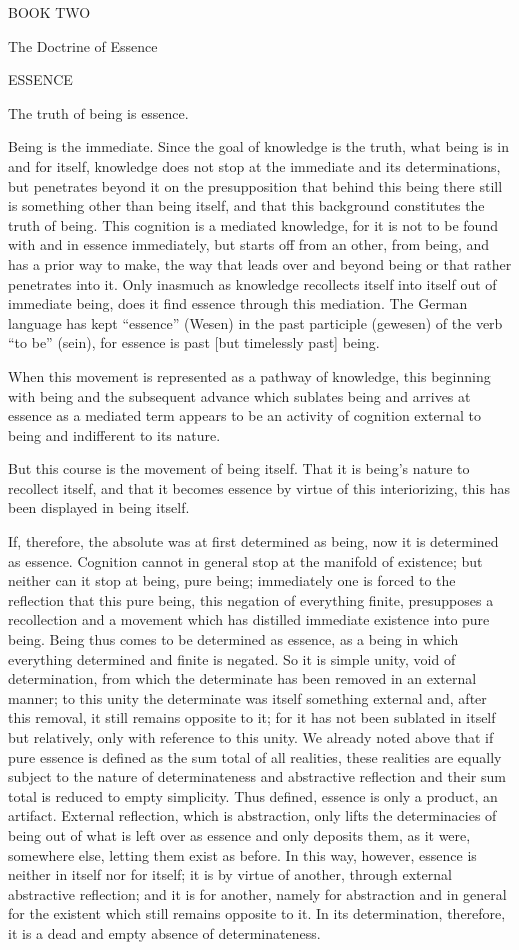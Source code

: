 BOOK TWO

The Doctrine of Essence

ESSENCE

The truth of being is essence.

Being is the immediate.
Since the goal of knowledge is the truth,
what being is in and for itself,
knowledge does not stop at
the immediate and its determinations,
but penetrates beyond it on
the presupposition that
behind this being there still is
something other than being itself,
and that this background
constitutes the truth of being.
This cognition is a mediated knowledge,
for it is not to be found
with and in essence immediately,
but starts off from an other, from being,
and has a prior way to make,
the way that leads over and beyond being
or that rather penetrates into it.
Only inasmuch as knowledge recollects
itself into itself out of immediate being,
does it find essence through this mediation.
The German language has kept “essence” (Wesen)
in the past participle (gewesen) of the verb “to be” (sein),
for essence is past [but timelessly past] being.

When this movement is represented as a pathway of knowledge,
this beginning with being and the subsequent advance
which sublates being and arrives at essence as a mediated term
appears to be an activity of cognition external to being
and indifferent to its nature.

But this course is the movement of being itself.
That it is being's nature to recollect itself,
and that it becomes essence by virtue of this interiorizing,
this has been displayed in being itself.

If, therefore, the absolute was
at first determined as being,
now it is determined as essence.
Cognition cannot in general stop
at the manifold of existence;
but neither can it stop at being, pure being;
immediately one is forced to the reflection that
this pure being, this negation of everything finite,
presupposes a recollection and a movement
which has distilled immediate existence into pure being.
Being thus comes to be determined as essence,
as a being in which everything determined and finite is negated.
So it is simple unity, void of determination,
from which the determinate has been
removed in an external manner;
to this unity the determinate was
itself something external
and, after this removal,
it still remains opposite to it;
for it has not been sublated in itself but relatively,
only with reference to this unity.
We already noted above that if pure essence is defined
as the sum total of all realities,
these realities are equally subject to
the nature of determinateness and abstractive reflection
and their sum total is reduced to empty simplicity.
Thus defined, essence is only a product, an artifact.
External reflection, which is abstraction, only lifts
the determinacies of being out of what is left over as essence
and only deposits them, as it were, somewhere else,
letting them exist as before.
In this way, however, essence is neither in itself nor for itself;
it is by virtue of another, through external abstractive reflection;
and it is for another, namely for abstraction
and in general for the existent
which still remains opposite to it.
In its determination, therefore,
it is a dead and empty absence of determinateness.

